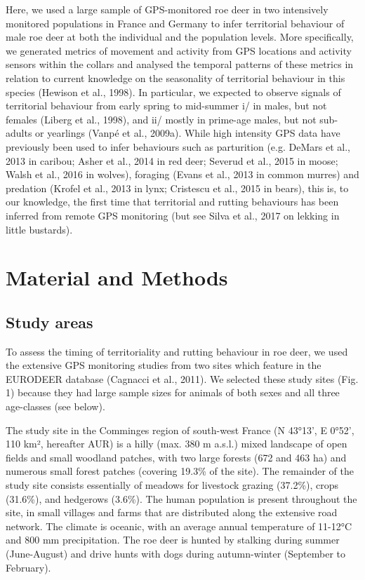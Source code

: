 \documentclass[a4paper,11pt]{article}
\begin{document}
Here, we used a large sample of GPS-monitored roe deer in two
intensively monitored populations in France and Germany to infer
territorial behaviour of male roe deer at both the individual and the
population levels. More specifically, we generated metrics of movement
and activity from GPS locations and activity sensors within the
collars and analysed the temporal patterns of these metrics in
relation to current knowledge on the seasonality of territorial
behaviour in this species (Hewison et al., 1998). In particular, we
expected to observe signals of territorial behaviour from early spring
to mid-summer i/ in males, but not females (Liberg et al., 1998), and
ii/ mostly in prime-age males, but not sub-adults or yearlings (Vanpé
et al., 2009a). While high intensity GPS data have previously been
used to infer behaviours such as parturition (e.g. DeMars et al., 2013
in caribou; Asher et al., 2014 in red deer; Severud et al., 2015 in
moose; Walsh et al., 2016 in wolves), foraging (Evans et al., 2013 in
common murres) and predation (Krofel et al., 2013 in lynx; Cristescu
et al., 2015 in bears), this is, to our knowledge, the first time that
territorial and rutting behaviours has been inferred from remote GPS
monitoring (but see Silva et al., 2017 on lekking in little bustards).

\section{Material and Methods}
\subsection{Study areas}

To assess the timing of territoriality and rutting behaviour in roe
deer, we used the extensive GPS monitoring studies from two sites
which feature in the EURODEER database (Cagnacci et al., 2011). We
selected these study sites (Fig. 1) because they had large sample
sizes for animals of both sexes and all three age-classes (see below).

The study site in the Comminges region of south-west France (N 43°13',
E 0°52', 110 km², hereafter AUR) is a hilly (max. 380 m a.s.l.) mixed
landscape of open fields and small woodland patches, with two large
forests (672 and 463 ha) and numerous small forest patches (covering
19.3\% of the site). The remainder of the study site consists
essentially of meadows for livestock grazing (37.2\%), crops (31.6\%),
and hedgerows (3.6\%). The human population is present throughout the
site, in small villages and farms that are distributed along the
extensive road network. The climate is oceanic, with an average annual
temperature of 11-12°C and 800 mm precipitation. The roe deer is
hunted by stalking during summer (June-August) and drive hunts with
dogs during autumn-winter (September to February).
\end{document}
